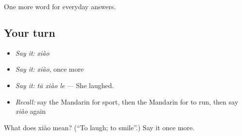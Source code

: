 \begin{grammarlens}[title={What you've built}]
One more word for everyday answers.
\end{grammarlens}

\subsection*{Your turn}
\begin{itemize}
\raggedright
  \item \emph{Say it:} \emph{xiào}
  \item \emph{Say it:} \emph{xiào}, once more
  \item \emph{Say it:} \emph{tā xiào le} — She laughed.
  \item \emph{Recall:} say the Mandarin for sport, then the Mandarin for to run, then say \emph{xiào} again
\end{itemize}

\begin{tcolorbox}[breakable,colback=teal!4,colframe=teal!35!black,title={Before you move on}]
What does xiào mean? (\textquotedblleft{}To laugh; to smile\textquotedblright{}.) Say it once more.
\end{tcolorbox}
